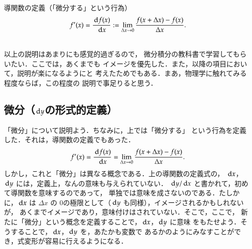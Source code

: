             \begin{itembox}[l]{導関数の定義（「微分する」という行為）}
            \begin{align}
                f'(x)=\frac{\,\mathrm{d} f(x)}{\,\mathrm{d} x}:=\lim_{\Delta x\rightarrow 0}\frac{f(x+\Delta x)-f(x)}{\Delta x}.
            \end{align}
            \end{itembox}\\

            以上の説明はあまりにも感覚的過ぎるので，
            微分積分の教科書で学習してもらいたい．ここでは，あくまでも
            イメージを優先した．また，以降の項目において，説明が楽になるようにと
            考えたためでもある．まあ，物理学に触れてみる程度ならば，この程度の
            説明で事足りると思う．

            \subsection{微分（$\,\mathrm{d} y$の形式的定義）}
            \begin{mycomment}
                「微分」について説明よう．ちなみに，上では「微分する」
                という行為を定義した．それは，導関数の定義でもあった．
                    \begin{align*}
                        f'(x) = \frac{\,\mathrm{d} f(x)}{\,\mathrm{d} x}
                              = \lim_{\Delta x\rightarrow 0}\frac{f(x+\Delta x)-f(x)}{\Delta x}.
                    \end{align*}
                しかし，これと「微分」は異なる概念である．上の導関数の定義式の，
                $\,\mathrm{d} x$，$\,\mathrm{d} y$ には，定義上，なんの意味も与えられていない．
                $\,\mathrm{d} y/ \,\mathrm{d} x$ と書かれて，初めて導関数を意味するのであって，
                単独では意味を成さないのである．たしかに，$\,\mathrm{d} x$ は $\Delta x$ の
                0の極限として（$\,\mathrm{d} y$ も同様），イメージされるかもしれないが，
                あくまでイメージであり，意味付けはされていない．そこで，ここで，
                新たに「微分」という概念を定義することで，$\,\mathrm{d} x$，$\,\mathrm{d} y$ に意味
                をもたせよう．そうすることで，$\,\mathrm{d} x$，$\,\mathrm{d} y$ を，あたかも変数で
                あるかのようにみなすことができ，式変形が容易に行えるようになる．
            \end{mycomment}

